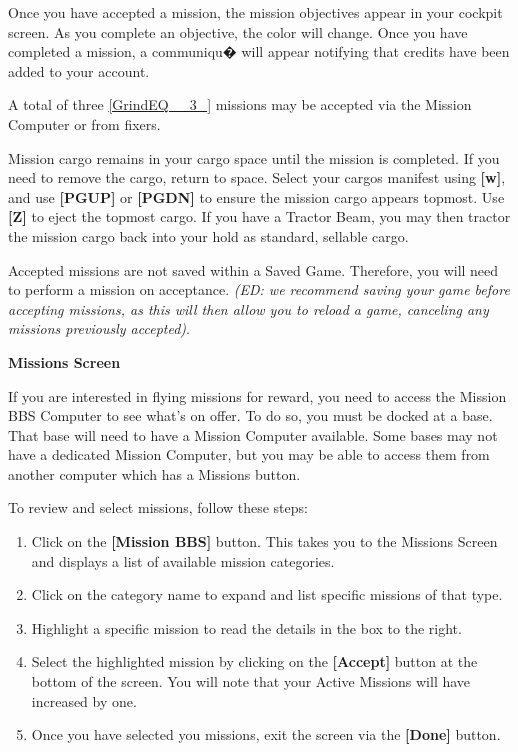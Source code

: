 \documentclass{article}
\begin{document}
Once you have accepted a mission, the mission objectives appear in your cockpit screen. As you complete an objective, the color will change. Once you have completed a mission, a communiqu� will appear notifying that credits have been added to your account. 

A total of three \eqref{GrindEQ__3_} missions may be accepted via the Mission Computer or from fixers. 

Mission cargo remains in your cargo space until the mission is completed. If you need to remove the cargo, return to space. Select your cargos manifest using \textbf{[w]}, and use \textbf{[PGUP] }or \textbf{[PGDN] }to ensure the mission cargo appears topmost. Use \textbf{[Z] }to eject the topmost cargo. If you have a Tractor Beam, you may then tractor the mission cargo back into your hold as standard, sellable cargo. 

Accepted missions are not saved within a Saved Game. Therefore, you will need to perform a mission on acceptance. \textit{(ED: we recommend saving your game before accepting missions, as this will then allow you to reload a game, canceling any missions previously accepted)}. 

\textbf{Missions Screen }

If you are interested in flying missions for reward, you need to access the Mission BBS Computer to see what's on offer. To do so, you must be docked at a base. That base will need to have a Mission Computer available. Some bases may not have a dedicated Mission Computer, but you may be able to access them from another computer which has a Missions button. 

To review and select missions, follow these steps: 

\begin{enumerate}
\item  Click on the \textbf{[Mission BBS] }button. This takes you to the Missions Screen and displays a list of available mission categories. 

\item  Click on the category name to expand and list specific missions of that type. 

\item  Highlight a specific mission to read the details in the box to the right. 

\item  Select the highlighted mission by clicking on the \textbf{[Accept] }button at the bottom of the screen. You will note that your Active Missions will have increased by one. 

\item  Once you have selected you missions, exit the screen via the \textbf{[Done]} button. 
\end{enumerate}
\end{document}

